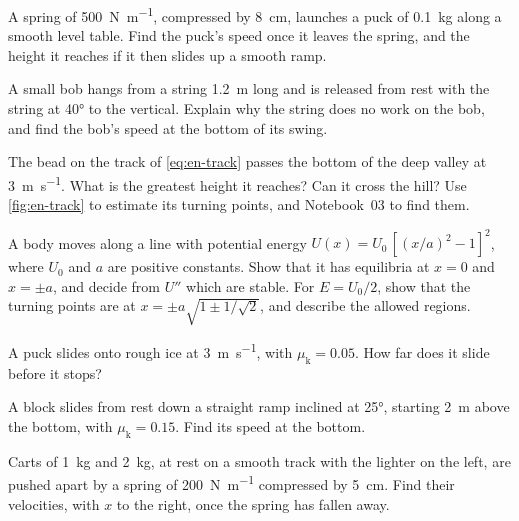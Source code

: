 \begin{exercise}[a launcher]
\label{ex:en-launcher}
A spring of \SI{500}{\newton\per\metre}, compressed by
\SI{8}{\centi\metre}, launches a puck of \SI{0.1}{\kilogram} along a
smooth level table. Find the puck's speed once it leaves the spring, and
the height it reaches if it then slides up a smooth ramp.
\end{exercise}

\begin{exercise}[a pendulum]
\label{ex:en-pendulum}
A small bob hangs from a string \SI{1.2}{\metre} long and is released
from rest with the string at \ang{40} to the vertical. Explain why the
string does no work on the bob, and find the bob's speed at the bottom of
its swing.
\end{exercise}

\begin{exercise}
\label{ex:en-track}
The bead on the track of \cref{eq:en-track} passes the bottom of the deep
valley at \SI{3}{\metre\per\second}. What is the greatest height it
reaches? Can it cross the hill? Use \cref{fig:en-track} to estimate its
turning points, and Notebook~03 to find them.
\end{exercise}

\begin{exercise}
\label{ex:en-double}
A body moves along a line with potential energy $U(x) = U_0\,[(x/a)^2 -
1]^2$, where $U_0$ and $a$ are positive constants. Show that it has
equilibria at $x = 0$ and $x = \pm a$, and decide from $U''$ which are
stable. For $E = U_0/2$, show that the turning points are at $x = \pm
a\sqrt{1 \pm 1/\sqrt2}$, and describe the allowed regions.
\end{exercise}

\begin{exercise}[on ice]
\label{ex:en-ice}
A puck slides onto rough ice at \SI{3}{\metre\per\second}, with
$\mu_{\mathrm{k}} = 0.05$. How far does it slide before it stops?
\end{exercise}

\begin{exercise}
\label{ex:en-ramp}
A block slides from rest down a straight ramp inclined at \ang{25},
starting \SI{2}{\metre} above the bottom, with $\mu_{\mathrm{k}} = 0.15$.
Find its speed at the bottom.
\end{exercise}

\begin{exercise}
\label{ex:en-carts}
Carts of \SI{1}{\kilogram} and \SI{2}{\kilogram}, at rest on a smooth
track with the lighter on the left, are pushed apart by a spring of
\SI{200}{\newton\per\metre} compressed by \SI{5}{\centi\metre}. Find
their velocities, with $x$ to the right, once the spring has fallen away.
\end{exercise}

